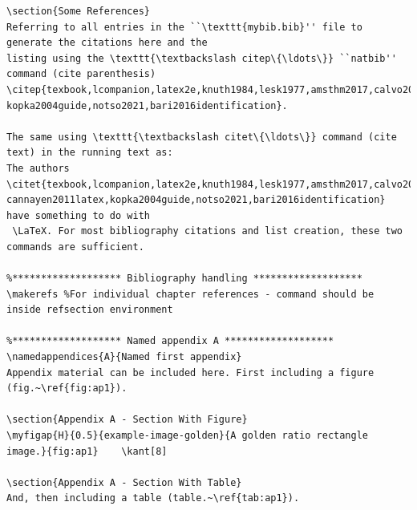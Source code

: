 \documentclass[letterpaper]{refart}
\begin{document}
{\begin{verbatim}
\section{Some References}
Referring to all entries in the ``\texttt{mybib.bib}'' file to generate the citations here and the 
listing using the \texttt{\textbackslash citep\{\ldots\}} ``natbib'' command (cite parenthesis) 
\citep{texbook,lcompanion,latex2e,knuth1984,lesk1977,amsthm2017,calvo2004using,cannayen2011latex,
kopka2004guide,notso2021,bari2016identification}.

The same using \texttt{\textbackslash citet\{\ldots\}} command (cite text) in the running text as: 
The authors \citet{texbook,lcompanion,latex2e,knuth1984,lesk1977,amsthm2017,calvo2004using,
cannayen2011latex,kopka2004guide,notso2021,bari2016identification} have something to do with 
 \LaTeX. For most bibliography citations and list creation, these two commands are sufficient.

%******************* Bibliography handling *******************
\makerefs %For individual chapter references - command should be inside refsection environment

%******************* Named appendix A *******************
\namedappendices{A}{Named first appendix}
Appendix material can be included here. First including a figure (fig.~\ref{fig:ap1}).

\section{Appendix A - Section With Figure}
\myfigap{H}{0.5}{example-image-golden}{A golden ratio rectangle image.}{fig:ap1}	\kant[8]

\section{Appendix A - Section With Table}
And, then including a table (table.~\ref{tab:ap1}).


\end{verbatim}}
\end{document}
